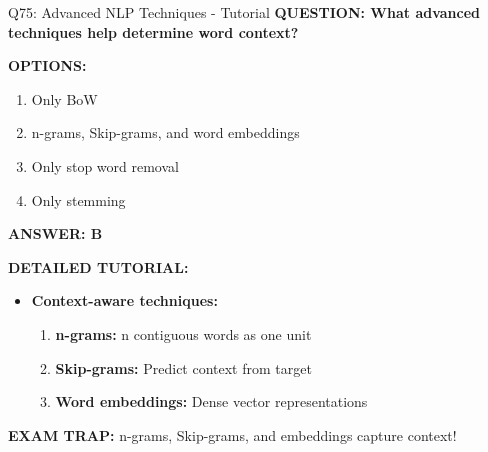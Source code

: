 \documentclass[8pt]{beamer}
\begin{document}
	\begin{frame}{Q75: Advanced NLP Techniques - Tutorial}
		\fontsize{6.5}{7.5}\selectfont
		\textbf{QUESTION: What advanced techniques help determine word context?}
		
		\vspace{0.1cm}
		\textbf{OPTIONS:}
		\begin{enumerate}
			\item Only BoW
			\item n-grams, Skip-grams, and word embeddings
			\item Only stop word removal
			\item Only stemming
		\end{enumerate}
		
		\vspace{0.1cm}
		\textcolor{myblue}{\textbf{ANSWER: B}}
		
		\vspace{0.1cm}
		\textbf{DETAILED TUTORIAL:}
		\begin{itemize}
			\item \textbf{Context-aware techniques:}
			\begin{enumerate}
				\item \textbf{n-grams:} n contiguous words as one unit
				\item \textbf{Skip-grams:} Predict context from target
				\item \textbf{Word embeddings:} Dense vector representations
			\end{enumerate}
		\end{itemize}
		
		\textcolor{myred}{\textbf{EXAM TRAP:}} \textcolor{myblue}{n-grams, Skip-grams, and embeddings} capture context!
	\end{frame}
	
\end{document}
